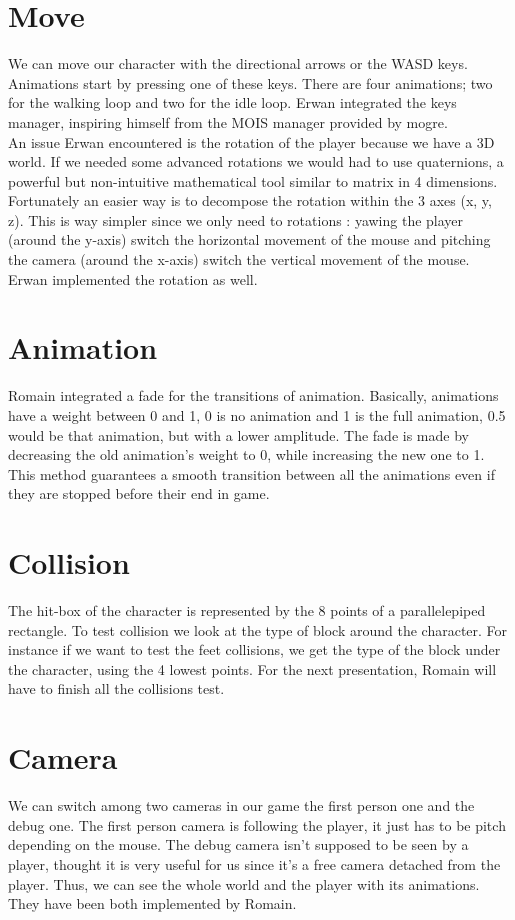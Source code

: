 \documentclass[article]{report} %
\begin{document}
			\section{Move}
				We can move our character with the directional arrows or the WASD keys. Animations start by pressing one of these keys. There are four animations; two for the walking loop and two for the idle loop. Erwan integrated the keys manager, inspiring himself from the MOIS manager provided by mogre.\\

An issue Erwan encountered is the rotation of the player because we have a 3D world. If we needed some advanced rotations we would had to use quaternions, a powerful but non-intuitive mathematical tool similar to matrix in 4 dimensions. Fortunately an easier way is to decompose the rotation within the 3 axes (x, y, z). This is way simpler since we only need to rotations : yawing the player (around the y-axis) switch the horizontal movement of the mouse and pitching the camera (around the x-axis) switch the vertical movement of the mouse. Erwan implemented the rotation as well.
			\section{Animation}
				Romain integrated a fade for the transitions of animation. Basically, animations have a weight between 0 and 1, 0 is no animation and 1 is the full animation, 0.5 would be that animation, but with a lower amplitude. The fade is made by decreasing the old animation's weight to 0, while increasing the new one to 1. This method guarantees a smooth transition between all the animations even if they are stopped before their end in game.

			\section{Collision}
				The hit-box of the character is represented by the 8 points of a parallelepiped rectangle. To test collision we look at the type of block around the character. For instance if we want to test the feet collisions, we get the type of the block under the character, using the 4 lowest points. For the next presentation, Romain will have to finish all the collisions test.

			\section{Camera}
				We can switch among two cameras in our game the first person one and the debug one. The first person camera is following the player, it just has to be pitch depending on the mouse. The debug camera isn't supposed to be seen by a player, thought it is very useful for us since it's a free camera detached from the player. Thus, we can see the whole world and the player with its animations. They have been both implemented by Romain.
\end{document}

